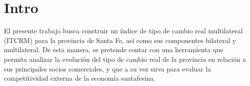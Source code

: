 \chapter{Intro}\label{chap1} 

El presente trabajo busca construir un índice de tipo de cambio real multilateral (ITCRM) para la provincia de Santa Fe, así como sus componentes bilateral y multilateral. De esta manera, se pretende contar con una herramienta que permita analizar la evolución del tipo de cambio real de la provincia en relación a sus principales socios comerciales, y que a su vez sirva para evaluar la competitividad externa de la economía santafesina.
